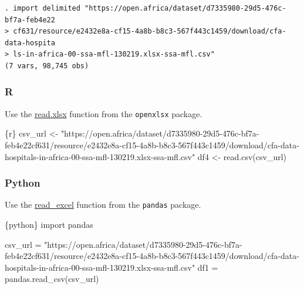 \documentclass[
  letterpaper,
  DIV=11,
  numbers=noendperiod,
  oneside]{scrreprt}
\newenvironment{Shaded}{\begin{snugshade}}{\end{snugshade}}
\newcommand{\FunctionTok}[1]{\textcolor[rgb]{0.28,0.35,0.67}{#1}}
\newcommand{\ImportTok}[1]{\textcolor[rgb]{0.00,0.46,0.62}{#1}}
\newcommand{\InformationTok}[1]{\textcolor[rgb]{0.37,0.37,0.37}{#1}}
\newcommand{\NormalTok}[1]{\textcolor[rgb]{0.00,0.23,0.31}{#1}}
\newcommand{\OperatorTok}[1]{\textcolor[rgb]{0.37,0.37,0.37}{#1}}
\newcommand{\OtherTok}[1]{\textcolor[rgb]{0.00,0.23,0.31}{#1}}
\newcommand{\StringTok}[1]{\textcolor[rgb]{0.13,0.47,0.30}{#1}}
\begin{document}
\begin{verbatim}
. import delimited "https://open.africa/dataset/d7335980-29d5-476c-bf7a-feb4e22
> cf631/resource/e2432e8a-cf15-4a8b-b8c3-567f443c1459/download/cfa-data-hospita
> ls-in-africa-00-ssa-mfl-130219.xlsx-ssa-mfl.csv"
(7 vars, 98,745 obs)
\end{verbatim}

\hypertarget{r-3}{%
\subsubsection{R}\label{r-3}}

Use the
\href{https://www.rdocumentation.org/packages/openxlsx/versions/4.2.5/topics/read.xlsx}{read.xlsx}
function from the \texttt{openxlsx} package.

\begin{Shaded}
\begin{Highlighting}[]
\InformationTok{\textasciigrave{}\textasciigrave{}\textasciigrave{}\{r\}}
\NormalTok{csv\_url }\OtherTok{\textless{}{-}} \StringTok{"https://open.africa/dataset/d7335980{-}29d5{-}476c{-}bf7a{-}feb4e22cf631/resource/e2432e8a{-}cf15{-}4a8b{-}b8c3{-}567f443c1459/download/cfa{-}data{-}hospitals{-}in{-}africa{-}00{-}ssa{-}mfl{-}130219.xlsx{-}ssa{-}mfl.csv"}
\NormalTok{df4 }\OtherTok{\textless{}{-}} \FunctionTok{read.csv}\NormalTok{(csv\_url)}
\InformationTok{\textasciigrave{}\textasciigrave{}\textasciigrave{}}
\end{Highlighting}
\end{Shaded}

\hypertarget{python-3}{%
\subsubsection{Python}\label{python-3}}

Use the
\href{https://pandas.pydata.org/docs/reference/api/pandas.read_excel.html}{read\_excel}
function from the \texttt{pandas} package.

\begin{Shaded}
\begin{Highlighting}[]
\InformationTok{\textasciigrave{}\textasciigrave{}\textasciigrave{}\{python\}}
\ImportTok{import}\NormalTok{ pandas}

\NormalTok{csv\_url }\OperatorTok{=} \StringTok{"https://open.africa/dataset/d7335980{-}29d5{-}476c{-}bf7a{-}feb4e22cf631/resource/e2432e8a{-}cf15{-}4a8b{-}b8c3{-}567f443c1459/download/cfa{-}data{-}hospitals{-}in{-}africa{-}00{-}ssa{-}mfl{-}130219.xlsx{-}ssa{-}mfl.csv"}
\NormalTok{df1 }\OperatorTok{=}\NormalTok{ pandas.read\_csv(csv\_url)}
\InformationTok{\textasciigrave{}\textasciigrave{}\textasciigrave{}}
\end{Highlighting}
\end{Shaded}
\end{document}
